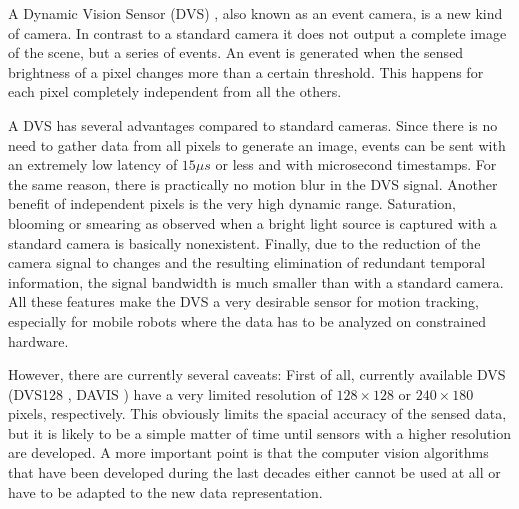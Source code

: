 A Dynamic Vision Sensor (DVS) \cite{lpd08dvs}, also known as an event camera,
is a new kind of camera. In contrast to a standard camera it does not output a
complete image of the scene, but a series of events. An event is generated when
the sensed brightness of a pixel changes more than a certain threshold. This
happens for each pixel completely independent from all the others.

A DVS has several advantages compared to standard cameras. Since there is no
need to gather data from all pixels to generate an image, events can be sent
with an extremely low latency of $15 \mu s$ or less \cite{brandli14davis, lpd08dvs} and
with microsecond timestamps.  For the same reason, there is practically no
motion blur in the DVS signal.  Another benefit of independent pixels is the
very high dynamic range.  Saturation, blooming or smearing as observed when a
bright light source is captured with a standard camera is basically
nonexistent. Finally, due to the reduction of the camera signal to changes and
the resulting elimination of redundant temporal information, the signal
bandwidth is much smaller than with a standard camera.
All these features make the DVS a very desirable sensor for motion tracking,
especially for mobile robots where the data has to be analyzed on constrained
hardware.

However, there are currently several caveats: First of all, currently available
DVS (DVS128 \cite{lpd08dvs}, DAVIS \cite{brandli14davis}) have a very limited
resolution of $128 \times 128$ or $240 \times 180$ pixels, respectively. This
obviously limits the spacial accuracy of the sensed data, but it is likely to
be a simple matter of time until sensors with a higher resolution are
developed. A more important point is that the computer vision algorithms that
have been developed during the last decades either cannot be used at all or
have to be adapted to the new data representation.
